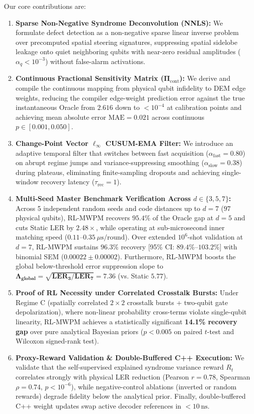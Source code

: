 \documentclass[aps,prxquantum,reprint,superscriptaddress,floatfix,nofootinbib]{revtex4-2}
\begin{document}
Our core contributions are:
\begin{enumerate}
    \item \textbf{Sparse Non-Negative Syndrome Deconvolution (NNLS):} We formulate defect detection as a non-negative sparse linear inverse problem over precomputed spatial steering signatures, suppressing spatial sidelobe leakage onto quiet neighboring qubits with near-zero residual amplitudes ($\alpha_q < 10^{-3}$) without false-alarm activations.
    \item \textbf{Continuous Fractional Sensitivity Matrix ($\mathbf{\Pi}_{\text{cont}}$):} We derive and compile the continuous mapping from physical qubit infidelity to DEM edge weights, reducing the compiler edge-weight prediction error against the true instantaneous Oracle from $2.616$ down to $<10^{-4}$ at calibration points and achieving mean absolute error $\text{MAE} = 0.021$ across continuous $p \in [0.001, 0.050]$.
    \item \textbf{Change-Point Vector $\ell_\infty$ CUSUM-EMA Filter:} We introduce an adaptive temporal filter that switches between fast acquisition ($\alpha_{\text{fast}} = 0.80$) on abrupt regime jumps and variance-suppressing smoothing ($\alpha_{\text{slow}} = 0.38$) during plateaus, eliminating finite-sampling dropouts and achieving single-window recovery latency ($\tau_{\text{rec}} = 1$).
    \item \textbf{Multi-Seed Master Benchmark Verification Across $d \in \{3, 5, 7\}$:} Across 5 independent random seeds and code distances up to $d=7$ ($97$ physical qubits), RL-MWPM recovers $95.4\%$ of the Oracle gap at $d=5$ and cuts Static LER by $2.48\times$, while operating at sub-microsecond inner matching speed ($0.11\text{--}0.35\ \mu\text{s}/\text{round}$). Over extended $10^6$-shot validation at $d=7$, RL-MWPM sustains $96.3\%$ recovery [95\% CI: $89.4\%\text{--}103.2\%$] with binomial SEM ($0.00022 \pm 0.00002$). Furthermore, RL-MWPM boosts the global below-threshold error suppression slope to $\mathbf{\Lambda_{\text{global}} = \sqrt{\text{LER}_3/\text{LER}_7} = 7.36}$ (vs. Static $5.77$).
    \item \textbf{Proof of RL Necessity under Correlated Crosstalk Bursts:} Under Regime C (spatially correlated $2\times 2$ crosstalk bursts + two-qubit gate depolarization), where non-linear probability cross-terms violate single-qubit linearity, RL-MWPM achieves a statistically significant \textbf{14.1\% recovery gap} over pure analytical Bayesian priors ($p < 0.005$ on paired $t$-test and Wilcoxon signed-rank test).
    \item \textbf{Proxy-Reward Validation \& Double-Buffered C++ Execution:} We validate that the self-supervised explained syndrome variance reward $R_t$ correlates strongly with physical LER reduction (Pearson $r = 0.78$, Spearman $\rho = 0.74$, $p < 10^{-6}$), while negative-control ablations (inverted or random rewards) degrade fidelity below the analytical prior. Finally, double-buffered C++ weight updates swap active decoder references in $<10\ \text{ns}$.
\end{enumerate}
\end{document}

